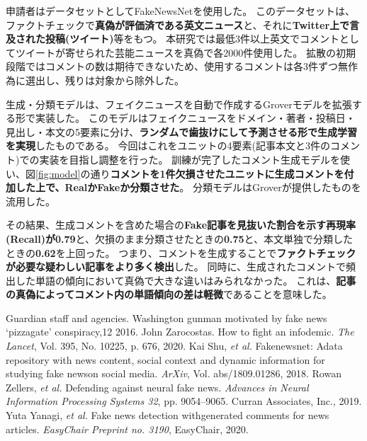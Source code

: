 {	申請者はデータセットとしてFakeNewsNet\cite{Shu2018FakeNewsNetAD}を使用した。
	このデータセットは、ファクトチェックで\textbf{真偽が評価済である英文ニュース}と、それに\textbf{Twitter上で言及された投稿(ツイート)}等をもつ。
	本研究では最低3件以上英文でコメントとしてツイートが寄せられた芸能ニュースを真偽で各2000件使用した。
	拡散の初期段階ではコメントの数は期待できないため、使用するコメントは各3件ずつ無作為に選出し、残りは対象から除外した。

	生成・分類モデルは、フェイクニュースを自動で作成するGroverモデル\cite{NIPS2019_9106}を拡張する形で実装した。
	このモデルはフェイクニュースをドメイン・著者・投稿日・見出し・本文の5要素に分け、\textbf{ランダムで歯抜けにして予測させる形で生成学習を実現}したものである。
	今回はこれをユニットの4要素(記事本文と3件のコメント)での実装を目指し調整を行った。
	訓練が完了したコメント生成モデルを使い、図\ref{fig:model}の通り\textbf{コメントを1件欠損させたユニットに生成コメントを付加した上で、RealかFakeか分類させた}。
	分類モデルはGroverが提供したものを流用した。

	その結果、生成コメントを含めた場合の\textbf{Fake記事を見抜いた割合を示す再現率(Recall)が0.79}と、欠損のまま分類させたときの\textbf{0.75}と、本文単独で分類したときの\textbf{0.62}を上回った。
	つまり、コメントを生成することで\textbf{ファクトチェックが必要な疑わしい記事をより多く検出}した\cite{EasyChair:3190}。
	同時に、生成されたコメントで頻出した単語の傾向において真偽で大きな違いはみられなかった。
	これは、\textbf{記事の真偽によってコメント内の単語傾向の差は軽微}であることを意味した。

	{\small 
	\begin{thebibliography}{99}
		 Guardian staff and agencies. Washington gunman motivated by fake news `pizzagate' conspiracy,12 2016.
		 John Zarocostas. How to fight an infodemic. \textit{The Lancet}, Vol. 395, No. 10225, p. 676, 2020.
		 Kai Shu, \textit{et al.} Fakenewsnet: Adata repository with news content, social context and dynamic information for studying fake newson social media. \textit{ArXiv}, Vol. abs/1809.01286, 2018.
		 Rowan Zellers, \textit{et al.} Defending against neural fake news. \textit{Advances in Neural Information Processing Systems 32}, pp. 9054–9065. Curran Associates, Inc., 2019.
		 Yuta Yanagi, \textit{et al.} Fake news detection withgenerated comments for news articles. \textit{EasyChair Preprint no. 3190}, EasyChair, 2020.
	\end{thebibliography}
	}
}

